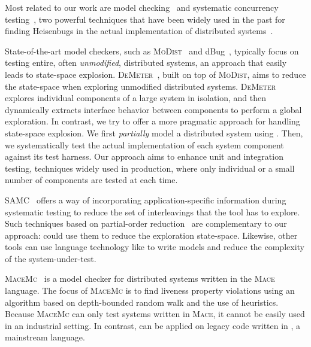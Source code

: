 Most related to our work are model checking~\cite{godefroid1997verisoft} and systematic concurrency testing~\cite{musuvathi2008finding, emmi2011delay, thomson2014sct}, two powerful techniques that have been widely used in the past for finding Heisenbugs in the actual implementation of distributed systems~\cite{killian2007life, yang2009modist, yabandeh2009crystalball, guerraoui2011model, guo2011practical, simsa2011dbug, gunawi2011fate, leesatapornwongsa2014samc}.

State-of-the-art model checkers, such as \textsc{MoDist}~\cite{yang2009modist} and dBug~\cite{simsa2011dbug}, typically focus on testing entire, often \emph{unmodified}, distributed systems, an approach that easily leads to state-space explosion. \textsc{DeMeter}~\cite{guo2011practical}, built on top of \textsc{MoDist}, aims to reduce the state-space when exploring unmodified distributed systems. \textsc{DeMeter} explores individual components of a large system in isolation, and then dynamically extracts interface behavior between components to perform a global exploration. In contrast, we try to offer a more pragmatic approach for handling state-space explosion. We first \emph{partially} model a distributed system using \psharp. Then, we systematically test the actual implementation of each system component against its \psharp test harness. Our approach aims to enhance unit and integration testing, techniques widely used in production, where only individual or a small number of components are tested at each time.

SAMC~\cite{leesatapornwongsa2014samc} offers a way of incorporating application-specific information during systematic testing to reduce the set of interleavings that the tool has to explore. Such techniques based on partial-order reduction~\cite{godefroid1996partial, flanagan2005dynamic} are complementary to our approach: \psharp could use them to reduce the exploration state-space. Likewise, other tools can use language technology like \psharp to write models and reduce the complexity of the system-under-test.

\textsc{MaceMc}~\cite{killian2007life} is a model checker for distributed systems written in the \textsc{Mace}~\cite{killian2007mace} language. The focus of \textsc{MaceMc} is to find liveness property violations using an algorithm based on depth-bounded random walk and the use of heuristics. Because \textsc{MaceMc} can only test systems written in \textsc{Mace}, it cannot be easily used in an industrial setting. In contrast, \psharp can be applied on legacy code written in \csharp, a mainstream language.

